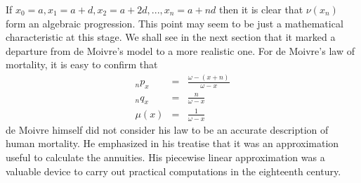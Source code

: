 \documentclass{article}
\numberwithin{equation}{section}
\begin{document}
If $x_0 = a, x_1 = a + d, x_2 = a + 2d, ..., x_n = a + nd$ then it is clear 
that $\nu(x_n)$ form an algebraic progression. This point may seem to be just a 
mathematical characteristic at this stage. We shall see in the next section that
it marked a departure from de Moivre's model to a more realistic one. For de 
Moivre's law of mortality, it is easy to confirm that
\begin{eqnarray}
{}_np_x &=& \frac{\omega - (x + n)}{\omega - x} \label{s1e6} \\
{}_nq_x &=& \frac{n}{\omega - x} \label{s1e7} \\
\mu(x) &=& \frac{1}{\omega - x} \label{s1e8}
\end{eqnarray}
de Moivre himself did not consider his law to be an accurate description of
human mortality. He emphasized in his treatise that it was an approximation
useful to calculate the annuities. His piecewise linear approximation was a
valuable device to carry out practical computations in the eighteenth century.
\end{document}
